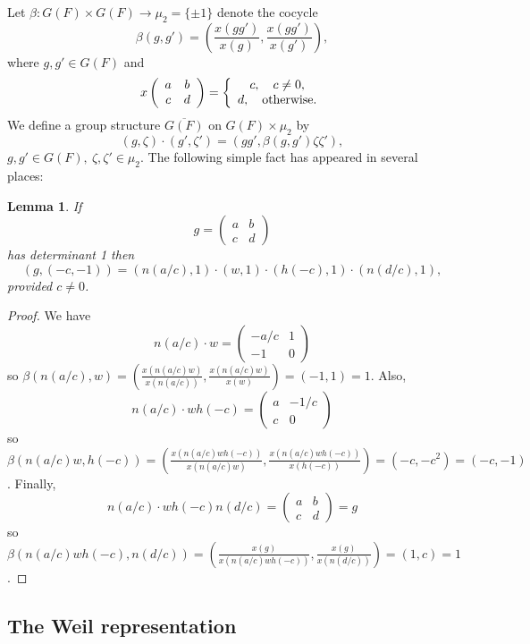 \documentclass[12pt,letterpaper]{book}
\theoremstyle{plain}
\newtheorem{lemma}[theorem]{Lemma}
\theoremstyle{definition}
\theoremstyle{remark}
\theoremstyle{remark}
\begin{document}
Let $\beta: G(F)\times G(F)\rightarrow \mu_2=\{\pm 1\}$
denote the cocycle
\[
\beta(g,g')=({\frac{x(gg')}{x(g)}}, {\frac{x(gg')}{x(g')}} ),
\]
where $g,g'\in G(F)$ and
\[
x\left(
\begin{array}{cc}
a & b \\
c & d
\end{array}
\right)
=
\left\{
    \begin{array}{c}
    c,\ \ \ c\not= 0,\\
    d,\ \ \ {\rm otherwise}.
    \end{array}
\right.
\]
We define a group structure $\overline{G(F)}$ on
$G(F)\times \mu_2$ by
\[
(g,\zeta)\cdot (g',\zeta')=(gg',\beta(g,g')\zeta\zeta'),
\]
$g,g'\in G(F),\ \zeta,\zeta'\in \mu_2$.
The following simple fact has appeared in several places:

\begin{lemma} If
\[
g=\left(
\begin{array}{cc}
a & b \\
c & d
\end{array}
\right)
\]
has determinant 1 then
\[
(g,(-c,-1))=(n(a/c),1)\cdot (w,1)\cdot (h(-c),1)\cdot (n(d/c),1),
\]
provided $c\not= 0$.
\end{lemma}

\begin{proof} We have
\[
n(a/c)\cdot w =
\left(
\begin{array}{cc}
-a/c & 1 \\
-1 & 0
\end{array}
\right)
\]
so $\beta(n(a/c),w)
=({\frac{x(n(a/c)w)}{x(n(a/c))}},{\frac{x(n(a/c)w)}{x(w)}})
=(-1,1)=1$.
Also,
\[
n(a/c)\cdot w h(-c) =
\left(
\begin{array}{cc}
a & -1/c \\
c & 0
\end{array}
\right)
\]
so $\beta(n(a/c)w,h(-c))
=({\frac{x(n(a/c)wh(-c))}{x(n(a/c)w)}},{\frac{x(n(a/c)wh(-c))}{x(h(-c))}})
=(-c,-c^2)=(-c,-1)$.
Finally,
\[
n(a/c)\cdot w h(-c)n(d/c) =
\left(
\begin{array}{cc}
a & b \\
c & d
\end{array}
\right)=g
\]
so $\beta(n(a/c)wh(-c),n(d/c))
=({\frac{x(g)}{x(n(a/c)wh(-c))}},{\frac{x(g)}{x(n(d/c))}})
=(1,c)=1$.
\end{proof}

\subsection{The Weil representation}
\end{document}
